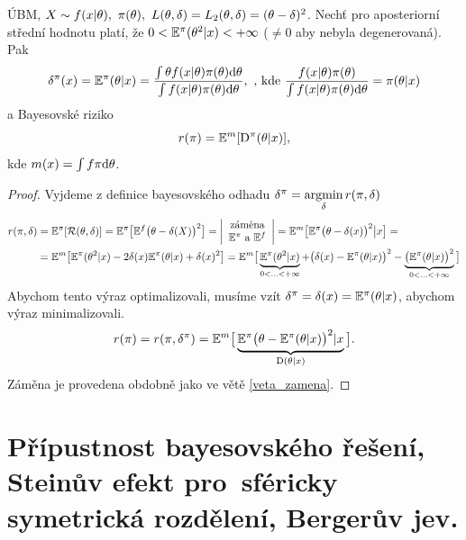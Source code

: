 \begin{theorem}[!!!Vyhazovací!!!]\label{vyhazovaci}
	ÚBM, $X\sim f(x|\theta),~\pi(\theta),~L(\theta,\delta)=L_2(\theta,\delta)=(\theta-\delta)^2$. Nechť pro aposteriorní střední hodnotu platí, že $0<\mathbb{E}^\pi(\theta^2|x)<+\infty$ ($\neq 0$ aby nebyla degenerovaná). Pak $$\delta^\pi(x)=\mathbb{E}^\pi(\theta|x)=\frac{\int\theta f(x|\theta)\pi(\theta)\mathrm{d}\theta}{\int f(x|\theta)\pi(\theta)\mathrm{d}\theta}, \text{ , kde } \frac{f(x|\theta)\pi(\theta)}{\int f(x|\theta)\pi(\theta)\mathrm{d}\theta}=\pi(\theta|x)$$
	a Bayesovské riziko 
	$$r(\pi)=\mathbb{E}^m[\mathrm{D}^\pi(\theta|x)],$$
	kde $m(x)=\int f\pi\mathrm{d}\theta$.
	\begin{proof}
	Vyjdeme z definice bayesovského odhadu $\delta^\pi=\mathop{\mathrm{argmin}}\limits_{\delta} r(\pi,\delta)$
		\[
		\begin{split}
		r(\pi,\delta)&=\mathbb{E}^\pi[\mathcal{R}(\theta,\delta)]=\mathbb{E}^\pi\big[\mathbb{E}^f\big(\theta-\delta(X)\big)^2\big]=\left|\begin{array}{c}
		\text{záměna} \\ \mathbb{E}^\pi\text{ a }\mathbb{E}^f		
		\end{array}
		\right|=\mathbb{E}^m\big[\mathbb{E}^\pi\big(\theta-\delta(x)\big)^2\big|x\big]=\\&=\mathbb{E}^m\big[\mathbb{E}^\pi(\theta^2|x)-2\delta(x)\mathbb{E}^\pi(\theta|x)+\delta(x)^2\big]=\mathbb{E}^m\big[\underbrace{\mathbb{E}^\pi(\theta^2|x)}_{0<...<+\infty}+\big(\delta(x)-\mathbb{E}^\pi(\theta|x)\big)^2-\underbrace{\big(\mathbb{E}^\pi(\theta|x)\big)^2}_{0<...<+\infty}\big]
		\end{split}
		\] Abychom tento výraz optimalizovali, musíme vzít $\delta^{\pi}=\delta(x)=\mathbb{E}^\pi(\theta|x)$, abychom výraz minimalizovali.
		$$ r(\pi)=r(\pi,\delta^\pi)=\mathbb{E}^m\big[\underbrace{\mathbb{E}^\pi\big(\theta-\mathbb{E}^\pi(\theta|x)\big)^2|x}_{\mathrm{D}(\theta|x)}\big].$$
		Záměna je provedena obdobně jako ve větě \ref{veta_zamena}.
	\end{proof}
\end{theorem}

\chapter{Přípustnost bayesovského řešení, Steinův efekt pro~sféricky symetrická rozdělení, Bergerův jev.}

